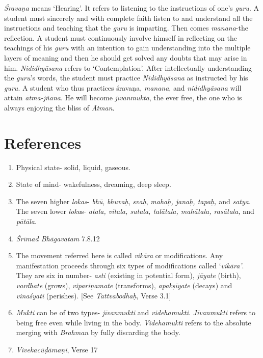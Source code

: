 \emph{Śravaṇa} means `Hearing'. It refers to listening to the instructions of one's \emph{guru}. A student must sincerely and with complete faith listen to and understand all the instructions and teaching that the \emph{guru} is imparting. Then comes \emph{manana}-the reflection. A student must continuously involve himself in reflecting on the teachings of his \emph{guru} with an intention to gain understanding into the multiple layers of meaning and then he should get solved any doubts that may arise in him. \emph{Nididhyāsana} refers to `Contemplation'. After intellectually understanding the \emph{guru}'s words, the student must practice \emph{Nididhyāsana} as instructed by his \emph{guru}. A student who thus practices śravaṇa, \emph{manana}, and \emph{nididhyāsana} will attain \emph{ātma-jñāna}. He will become \emph{jīvanmukta}, the ever free, the one who is always enjoying the bliss of \emph{Ātman}.

\section*{References}

\begin{enumerate}
\item
  Physical state- solid, liquid, gaseous.
\item
  State of mind- wakefulness, dreaming, deep sleep.
\item
  The seven higher \emph{lokas}- \emph{bhū}, \emph{bhuvaḥ}, \emph{svaḥ}, \emph{mahaḥ, janaḥ, tapaḥ,} and \emph{satya}. The seven lower \emph{loka}s- \emph{atala, vitala, sutala, talātala, mahātala, rasātala,} and \emph{pātāla}.
\item
  \emph{Śrīmad Bhāgavatam} 7.8.12
\item
  The movement referred here is called \emph{vikāra} or modifications. Any manifestation proceeds through six types of modifications called `\emph{vikāra'}. They are six in number- \emph{asti} (existing in potential form), \emph{jāyate} (birth), \emph{vardhate} (grows), \emph{vipariṇamate} (transforms), \emph{apakṣīyate} (decays) and \emph{vinaśyati} (perishes). {[}See \emph{Tattvabodhaḥ}, Verse 3.1{]}
\item
  \emph{Mukti} can be of two types- \emph{jīvanmukti} and \emph{videhamukti}. \emph{Jīvanmukti} refers to being free even while living in the body. \emph{Videhamukti} refers to the absolute merging with \emph{Brahman} by fully discarding the body.
\item
  \emph{Vivekacūḍāmaṇi}, Verse 17
\end{enumerate}
